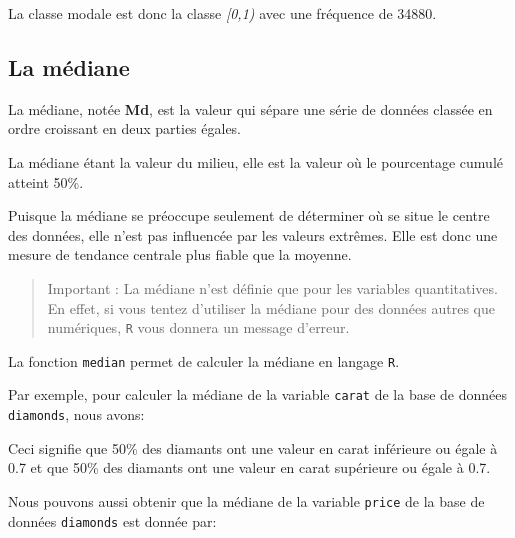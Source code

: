 \documentclass[]{book}
\newenvironment{Shaded}{\begin{snugshade}}{\end{snugshade}}
\newcommand{\KeywordTok}[1]{\textcolor[rgb]{0.13,0.29,0.53}{\textbf{#1}}}
\newcommand{\NormalTok}[1]{#1}
\newcommand{\OperatorTok}[1]{\textcolor[rgb]{0.81,0.36,0.00}{\textbf{#1}}}
\theoremstyle{definition}
\theoremstyle{definition}
\theoremstyle{definition}
\theoremstyle{remark}
\begin{document}
La classe modale est donc la classe \emph{{[}0,1)} avec une fréquence de
34880.

\hypertarget{la-mediane}{%
\subsection{La médiane}\label{la-mediane}}

La médiane, notée \textbf{Md}, est la valeur qui sépare une série de
données classée en ordre croissant en deux parties égales.

La médiane étant la valeur du milieu, elle est la valeur où le
pourcentage cumulé atteint 50\%.

Puisque la médiane se préoccupe seulement de déterminer où se situe le
centre des données, elle n'est pas influencée par les valeurs extrêmes.
Elle est donc une mesure de tendance centrale plus fiable que la
moyenne.

\begin{quote}
Important : La médiane n'est définie que pour les variables
quantitatives. En effet, si vous tentez d'utiliser la médiane pour des
données autres que numériques, \texttt{R} vous donnera un message
d'erreur.
\end{quote}

La fonction \texttt{median} permet de calculer la médiane en langage
\texttt{R}.

Par exemple, pour calculer la médiane de la variable \texttt{carat} de
la base de données \texttt{diamonds}, nous avons:

\begin{Shaded}
\end{Shaded}

Ceci signifie que 50\% des diamants ont une valeur en carat inférieure
ou égale à 0.7 et que 50\% des diamants ont une valeur en carat
supérieure ou égale à 0.7.

Nous pouvons aussi obtenir que la médiane de la variable \texttt{price}
de la base de données \texttt{diamonds} est donnée par:

\begin{Shaded}
\end{Shaded}
\end{document}

